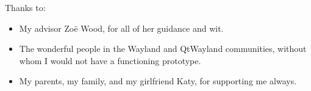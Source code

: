 \documentclass[12pt]{ucthesis}
\begin{document}
\begin{frontmatter}
\begin{abstract}
\end{abstract}


\begin{acknowledgements}

Thanks to:

\begin{itemize}
\item My advisor Zo{\"e} Wood, for all of her guidance and wit.
\item The wonderful people in the Wayland and QtWayland communities, without whom I would not have a functioning prototype.
\item My parents, my family, and my girlfriend Katy, for supporting me always.
\end{itemize}

\end{acknowledgements}

\tableofcontents

\listoftables

\listoffigures

\end{frontmatter}

\pagestyle{plain}

\renewcommand{\baselinestretch}{1.66}














\clearpage
\nocite{*}
%


%
\end{document}
